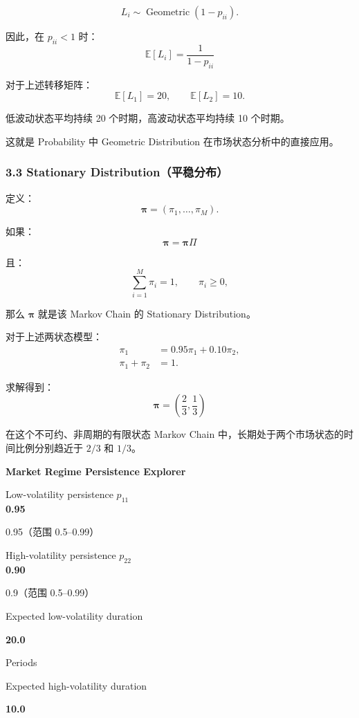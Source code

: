 \[L_i\sim\operatorname{Geometric}(1-p_{ii}).\]

因此，在 \(p_{ii}<1\) 时：
\[\boxed{
\mathbb E[L_i]=\frac1{1-p_{ii}}
}\]

对于上述转移矩阵：
\[\mathbb E[L_1]=20,
\qquad
\mathbb E[L_2]=10.\]

低波动状态平均持续 20 个时期，高波动状态平均持续 10 个时期。

这就是 Probability 中 Geometric Distribution 在市场状态分析中的直接应用。

\hypertarget{part-4-77-0001-stationary-distributionux5e73ux7a33ux5206ux5e03}{%
\subsubsection{3.3 Stationary Distribution（平稳分布）}\label{part-4-77-0001-stationary-distributionux5e73ux7a33ux5206ux5e03}}

定义：
\[\boldsymbol\pi=(\pi_1,\ldots,\pi_M).\]

如果：
\[\boxed{
\boldsymbol\pi=\boldsymbol\pi\Pi
}\]

且：
\[\sum_{i=1}^{M}\pi_i=1,
\qquad \pi_i\geq0,\]

那么 \(\boldsymbol\pi\) 就是该 Markov Chain 的 Stationary Distribution。

对于上述两状态模型：
\[\begin{aligned}
\pi_1&=0.95\pi_1+0.10\pi_2,\\
\pi_1+\pi_2&=1.
\end{aligned}\]

求解得到：
\[\boxed{
\boldsymbol\pi=
\left(\frac23,\frac13\right)
}\]

在这个不可约、非周期的有限状态 Markov Chain 中，长期处于两个市场状态的时间比例分别趋近于 \(2/3\) 和 \(1/3\)。

\textbf{Market Regime Persistence Explorer}

Low-volatility persistence \(p_{11}\)\\
\textbf{0.95}

0.95（范围 0.5--0.99）

High-volatility persistence \(p_{22}\)\\
\textbf{0.90}

0.9（范围 0.5--0.99）

Expected low-volatility duration

\textbf{20.0}

Periods

Expected high-volatility duration

\textbf{10.0}

